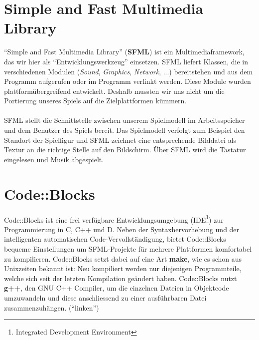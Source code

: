 \documentclass[11pt,a4paper]{scrbook}
\newcommand{\q}[1]{``#1''}
\begin{document}
\section{Simple and Fast Multimedia Library}
\q{Simple and Fast Multimedia Library} (\textbf{SFML}) ist ein Multimediaframework, das wir hier als
\q{Entwicklungswerkzeug} einsetzen.
SFML liefert Klassen, die in verschiedenen Modulen (\textit{Sound}, \textit{Graphics}, \textit{Network}, ...) bereitstehen und aus dem Programm aufgerufen oder im Programm verlinkt werden.
Diese Module wurden plattformübergreifend entwickelt. Deshalb mussten wir uns nicht um die Portierung unseres Spiels auf die Zielplattformen kümmern.
\\
\\
SFML stellt die Schnittstelle zwischen unserem Spielmodell im Arbeitsspeicher und dem Benutzer des Spiels bereit. Das Spielmodell verfolgt zum Beispiel den Standort der Spielfigur und SFML zeichnet eine entsprechende Bilddatei als Textur an die richtige Stelle auf den Bildschirm. Über SFML wird die Tastatur eingelesen und Musik abgespielt.

\section{Code::Blocks}
Code::Blocks ist eine frei verfügbare Entwicklungsumgebung (IDE\footnote{Integrated Development Environment}) zur Programmierung in C, C++ und D.
Neben der Syntaxhervorhebung und der intelligenten automatischen Code-Vervollständigung, bietet Code::Blocks bequeme Einstellungen um SFML-Projekte für mehrere Plattformen
komfortabel zu kompilieren. Code::Blocks setzt dabei auf eine Art \textbf{make}, wie es schon aus Unixzeiten bekannt ist: Neu kompiliert werden nur diejenigen Programmteile, welche sich
seit der letzten Kompilation geändert haben. Code::Blocks nutzt \textbf{g++}, den GNU C++ Compiler, um die einzelnen Dateien in Objektcode umzuwandeln und diese
anschliessend zu einer ausführbaren Datei zusammenzuhängen. (\q{linken})
\end{document}
